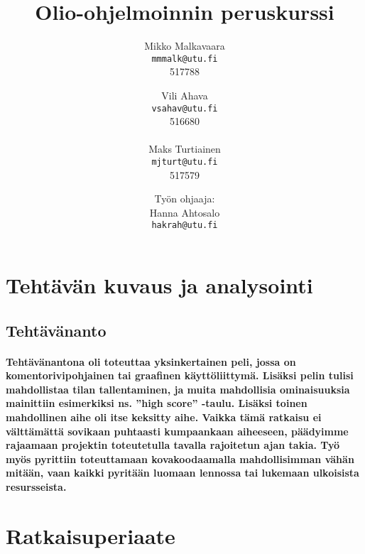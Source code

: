 \documentclass[10pt,a4paper,draft]{article}
\newcommand{\subtitle}[1]{%
  \posttitle{
    \par\end{center}
    \begin{center}\large#1\end{center}
    \vskip0.5cm}
}
\begin{document}
\author{
	Mikko Malkavaara\\
	\texttt{mmmalk@utu.fi}\\
	517788
	\and
	Vili Ahava\\
	\texttt{vsahav@utu.fi}\\
	516680\\
	\\
	\hspace{-4.5cm}
	Maks Turtiainen\\
	\hspace{-4.5cm}
	\texttt{mjturt@utu.fi}\\
	\hspace{-4.5cm}
	517579
}
\date{\vfill
Työn ohjaaja:\\
Hanna Ahtosalo\\
\texttt{hakrah@utu.fi}}
\title{Olio-ohjelmoinnin peruskurssi}
\subtitle{Harjoitustyö\vspace{5cm}}
\begin{titlingpage}
	\maketitle
\end{titlingpage}
\tableofcontents
\newpage
\section{Tehtävän kuvaus ja analysointi}
\subsection{Tehtävänanto}
\paragraph{Tehtävänantona oli toteuttaa yksinkertainen peli, jossa on komentorivipohjainen tai graafinen käyttöliittymä. Lisäksi pelin tulisi mahdollistaa tilan tallentaminen, ja muita mahdollisia ominaisuuksia mainittiin esimerkiksi ns. ''high score'' -taulu. Lisäksi toinen mahdollinen aihe oli itse keksitty aihe. Vaikka tämä ratkaisu ei välttämättä sovikaan puhtaasti kumpaankaan aiheeseen, päädyimme rajaamaan projektin toteutetulla tavalla rajoitetun ajan takia. Työ myös pyrittiin toteuttamaan kovakoodaamalla mahdollisimman vähän mitään, vaan kaikki pyritään luomaan lennossa tai lukemaan ulkoisista resursseista.}

\section{Ratkaisuperiaate}
\end{document}
